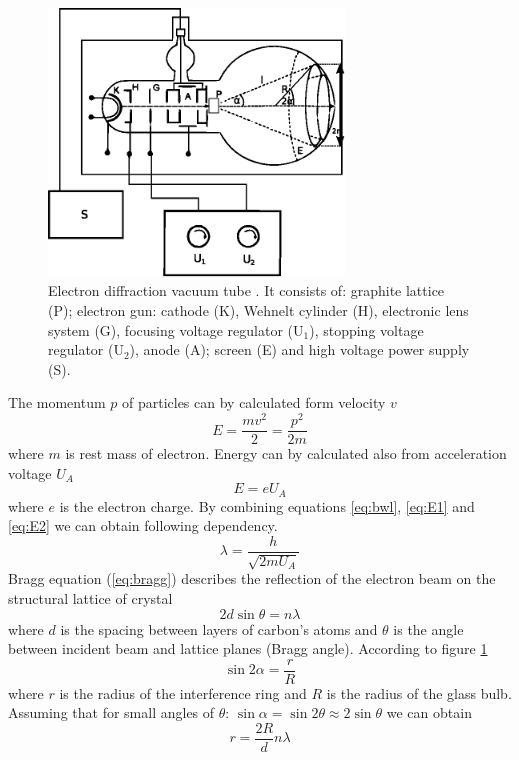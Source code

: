 \documentclass[a4paper,12pt]{article}
\begin{document}
\begin{figure}[h]
\begin{center}
    \includegraphics[width=0.7\textwidth]{tube}
    \caption{Electron diffraction vacuum tube \cite{E21}. It consists of: graphite lattice (P); electron gun: cathode (K), Wehnelt cylinder (H), electronic lens system (G), focusing voltage regulator (U$_{1}$), stopping voltage regulator (U$_{2}$), anode (A); screen (E) and high voltage power supply (S).}
    \label{fig:tube}
\end{center}
\end{figure}

The momentum $p$ of particles can by calculated form velocity $v$
\begin{equation}
    E = \frac{mv^2}{2} = \frac{p^2}{2m} \label{eq:E1}
\end{equation}
where $m$ is rest mass of electron. Energy can by calculated also from acceleration voltage $U_A$
\begin{equation}
    E = eU_A \label{eq:E2}
\end{equation}
where $e$ is the electron charge. By combining equations \ref{eq:bwl}, \ref{eq:E1} and \ref{eq:E2} we can obtain following dependency.
\begin{equation}
    \lambda = \frac{h}{\sqrt{2mU_A}}  \label{eq:bwl2}
\end{equation}
Bragg equation (\ref{eq:bragg}) describes the reflection of the electron beam on the structural lattice of crystal
\begin{equation}
    2d\sin\theta = n\lambda  \label{eq:bragg}
\end{equation}
where $d$ is the spacing between layers of carbon's atoms and $\theta$ is the angle between incident beam and lattice planes (Bragg angle).
According to figure \ref{fig:tube}
\begin{equation}
    \sin 2\alpha = \frac{r}{R} \label{eq:ang1}
\end{equation}
where $r$ is the radius of the interference ring and $R$ is the radius of the glass bulb.
Assuming that for small angles of $\theta$: $\sin \alpha = \sin 2 \theta \approx 2 \sin \theta$ we can obtain
\begin{equation}
    r = \frac{2R}{d} n \lambda \label{eq:r2}
\end{equation}
\end{document}
